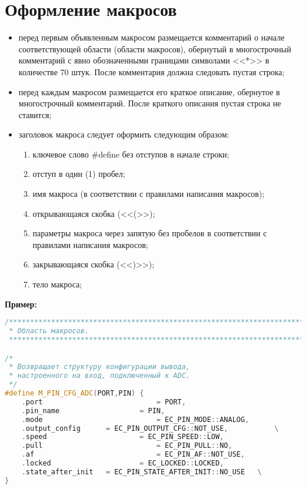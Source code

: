 \section{Оформление макросов}
\begin{itemize}
	\item перед первым объявленным макросом размещается комментарий о начале соответствующей области (области макросов), обернутый в многострочный комментарий с явно обозначенными границами символами <<*>> в количестве 70 штук. После комментария должна следовать  пустая строка;
	\item перед каждым макросом размещается его краткое описание, обернутое в многострочный комментарий. После краткого описания пустая строка не ставится;
	\item заголовок макроса следует оформить следующим образом:
	\begin{enumerate}
		\item ключевое слово \#define без отступов в начале строки;
		\item отступ в один (1) пробел;
		\item имя макроса (в соответствии с правилами написания макросов);
		\item открывающаяся скобка (<<(>>);
		\item параметры макроса через запятую без пробелов в соответствии с правилами написания макросов;
		\item закрывающаяся скобка (<<)>>);
		\item тело макроса;
	\end{enumerate}
\end{itemize}\textbf{Пример:}\begin{lstlisting}[language=C++, frame=tlBR, basicstyle=\fontsize{10}{10}\ttfamily]
/**********************************************************************
 * Область макросов.
 **********************************************************************/

/*
 * Возвращает структуру конфигурации вывода,
 * настроенного на вход, подключенный к ADC.
 */
#define M_PIN_CFG_ADC(PORT,PIN)	{											\
	.port							= PORT,														\
	.pin_name					= PIN,														\
	.mode							= EC_PIN_MODE::ANALOG,						\
	.output_config		= EC_PIN_OUTPUT_CFG::NOT_USE,			\
	.speed						= EC_PIN_SPEED::LOW,							\
	.pull							= EC_PIN_PULL::NO,								\
	.af								= EC_PIN_AF::NOT_USE,							\
	.locked						= EC_LOCKED::LOCKED,							\
	.state_after_init	= EC_PIN_STATE_AFTER_INIT::NO_USE	\
}\end{lstlisting}